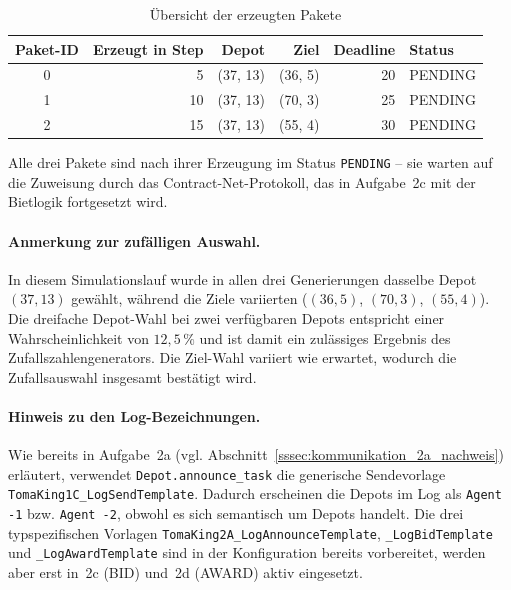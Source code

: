 \begin{table}[H]
    \centering
    \begin{tabular}{c r r r r l}
        \toprule
        \textbf{Paket-ID} & \textbf{Erzeugt in Step} & \textbf{Depot} & \textbf{Ziel} & \textbf{Deadline} & \textbf{Status} \\
        \midrule
        0 & 5  & (37, 13)   & (36, 5)  & 20 & PENDING \\
        1 & 10 & (37, 13)   & (70, 3)  & 25 & PENDING \\
        2 & 15 & (37, 13)   & (55, 4)  & 30 & PENDING \\
        \bottomrule
    \end{tabular}
    \caption{Übersicht der erzeugten Pakete}
    \label{tab:pakete_2b}
\end{table}

Alle drei Pakete sind nach ihrer Erzeugung im Status \texttt{PENDING} -- sie warten auf die Zuweisung durch das Contract-Net-Protokoll, das in Aufgabe~2c mit der Bietlogik fortgesetzt wird.

\paragraph{Anmerkung zur zufälligen Auswahl.}
In diesem Simulationslauf wurde in allen drei Generierungen dasselbe Depot~\((37, 13)\) gewählt, während die Ziele variierten (\((36, 5)\), \((70, 3)\), \((55, 4)\)). Die dreifache Depot-Wahl bei zwei verfügbaren Depots entspricht einer Wahrscheinlichkeit von \(12{,}5\,\%\) und ist damit ein zulässiges Ergebnis des Zufallszahlengenerators. Die Ziel-Wahl variiert wie erwartet, wodurch die Zufallsauswahl insgesamt bestätigt wird.

\paragraph{Hinweis zu den Log-Bezeichnungen.}
Wie bereits in Aufgabe~2a (vgl. Abschnitt~\ref{sssec:kommunikation_2a_nachweis}) erläutert, verwendet \texttt{Depot.announce\_task} die generische Sendevorlage \texttt{TomaKing1C\_LogSendTemplate}. Dadurch erscheinen die Depots im Log als \texttt{Agent -1} bzw. \texttt{Agent -2}, obwohl es sich semantisch um Depots handelt. Die drei typspezifischen Vorlagen \texttt{TomaKing2A\_LogAnnounceTemplate}, \texttt{\_LogBidTemplate} und \texttt{\_LogAwardTemplate} sind in der Konfiguration bereits vorbereitet, werden aber erst in~2c (BID) und~2d (AWARD) aktiv eingesetzt.

